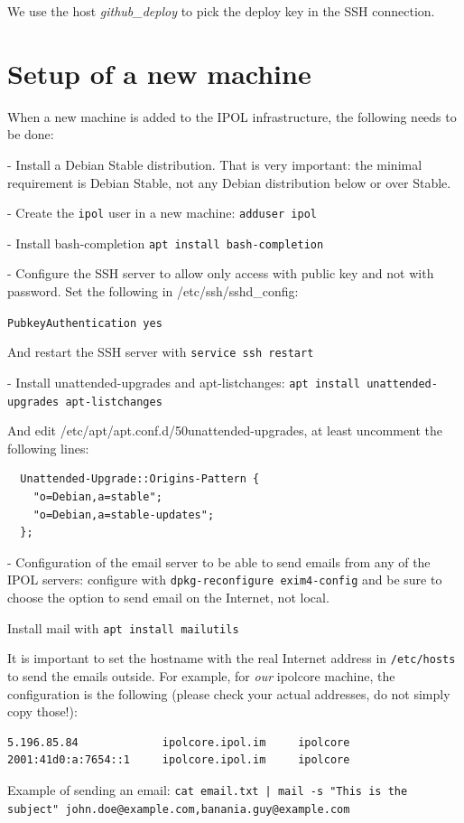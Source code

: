 \documentclass[a4paper,12pt]{article}
\begin{document}
We use the host \emph{github\_deploy} to pick the deploy key in the SSH connection.

\section{Setup of a new machine}
When a new machine is added to the IPOL infrastructure, the following needs to be done:

- Install a Debian Stable distribution. That is very important: the minimal requirement is Debian Stable, not any Debian distribution below or over Stable.

- Create the {\tt ipol} user in a new machine: {\tt adduser ipol}

- Install bash-completion {\tt apt install bash-completion}

- Configure the SSH server to allow only access with public key and not with password. Set the following in /etc/ssh/sshd\_config:

{\tt PubkeyAuthentication yes}

And restart the SSH server with {\tt service ssh restart}

- Install unattended-upgrades and apt-listchanges: {\tt apt install unattended-upgrades apt-listchanges}

And edit /etc/apt/apt.conf.d/50unattended-upgrades, at least uncomment the following lines:
\begin{verbatim}
  Unattended-Upgrade::Origins-Pattern {
    "o=Debian,a=stable";
    "o=Debian,a=stable-updates";
  };
\end{verbatim}

- Configuration of the email server to be able to send emails from any of the IPOL servers: configure with {\tt dpkg-reconfigure exim4-config} and be sure to choose the option to send email on the Internet, not local.

Install mail with {\tt apt install mailutils}

It is important to set the hostname with the real Internet address in {\tt /etc/hosts} to send the emails outside. For example, for \emph{our} ipolcore machine, the configuration is the following (please check your actual addresses, do not simply copy those!):

\begin{verbatim}
5.196.85.84             ipolcore.ipol.im     ipolcore
2001:41d0:a:7654::1     ipolcore.ipol.im     ipolcore
\end{verbatim}

Example of sending an email: {\tt cat email.txt | mail -s "This is the subject" john.doe@example.com,banania.guy@example.com}
\end{document}
